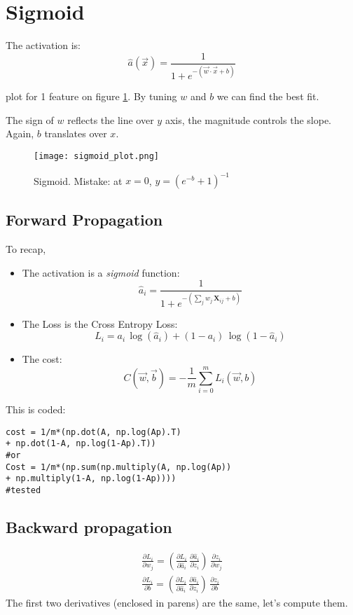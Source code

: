 \section{Sigmoid}
The activation is:
\[
  \hat{a}(\vec{x})= \frac{1}{1+e^{-(\vec{w}\cdot{}\vec{x}+b)}}
\]

plot for 1 feature on figure \ref{fig:sigmoid}. By tuning $w$ and $b$  we can find the best fit. 

The sign of $w$ reflects the line over $y$ axis, the magnitude controls the slope. Again, $b$ translates over $x$.

\begin{figure}[h]
 \centering
 \texttt{[image: sigmoid\_plot.png]}
  \caption{Sigmoid. Mistake: at $x=0$, $y=(e^{-b}+1)^{-1}$} \label{fig:sigmoid}
\end{figure}

\subsection{Forward Propagation}
To recap, 

\begin{itemize}
  \item The activation is a \textit{sigmoid} function:
\[
  \hat{a}_i = \frac{1}{1+e^{-(\sum_j w_j\, \mathbf{X}_{ij} + b)}}
\]

  \item The Loss is the Cross Entropy Loss:
\[
  L_i = a_i\,\log(\hat{a}_i) + (1-a_i)\,\log(1-\hat{a}_i)
\]

\item The cost:
\[
  C(\vec{w}, \vec{b}) = -\frac{1}{m}\sum_{i=0}^m L_i(\vec{w}, b)
\]
\end{itemize}
This is coded:
\begin{verbatim}
cost = 1/m*(np.dot(A, np.log(Ap).T) 
+ np.dot(1-A, np.log(1-Ap).T))
#or
Cost = 1/m*(np.sum(np.multiply(A, np.log(Ap)) 
+ np.multiply(1-A, np.log(1-Ap))))
#tested
\end{verbatim}

\subsection{Backward propagation}

\begin{align}
  \frac{\partial L_i}{\partial w_j} = 
  \left(\frac{\partial L_i}{\partial \hat{a}_i}\, \frac{\partial \hat{a}_i}{\partial z_i}\right)\,\frac{\partial z_i}{\partial w_j}\\
  \frac{\partial L_i}{\partial b} = 
  \left(\frac{\partial L_i}{\partial \hat{a}_i}\,\frac{\partial \hat{a}_i}{\partial z_i}\right)\,\frac{\partial z_i}{\partial b}
\end{align}
The first two derivatives (enclosed in parens) are the same, let's compute them.

